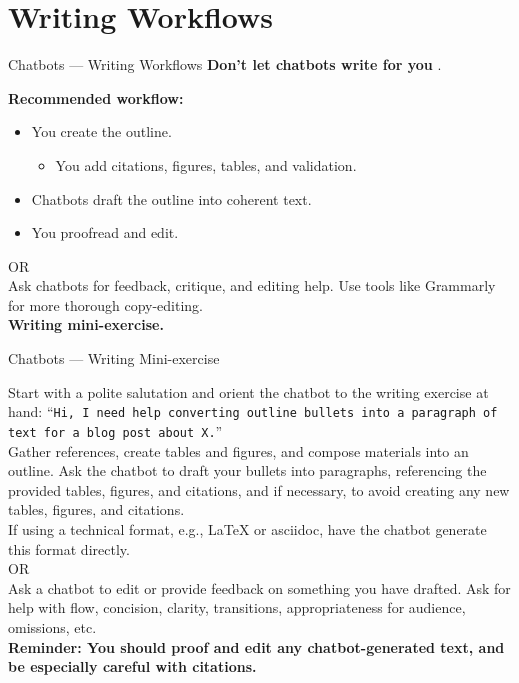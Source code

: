 \documentclass[aspectratio=169]{beamer}
\begin{document}
\section{Writing Workflows}

\begin{frame}[t]{Chatbots — Writing Workflows}
\textbf{Don’t let chatbots write for you} \parencite{alkaissi2023artificial}.

\vspace{1em}

\textbf{Recommended workflow:}
\begin{itemize}
    \item You create the outline.
    \begin{itemize}
        \item You add citations, figures, tables, and validation.
    \end{itemize}
    \item Chatbots draft the outline into coherent text.
    \item You proofread and edit.\\
\end{itemize}
\vspace{5pt}
OR\\ 
\vspace{10pt}
Ask chatbots for feedback, critique, and editing help. Use tools like Grammarly for more thorough copy-editing.\\ 
\vspace{1em}
\textbf{Writing mini-exercise.} 
\end{frame}

\begin{frame}[t]{Chatbots — Writing Mini-exercise}

\footnotesize
Start with a polite salutation and orient the chatbot to the writing exercise at hand: ``\texttt{Hi, I need help converting outline bullets into a paragraph of text for a blog post about X.}''\\
\vspace{1em}
Gather references, create tables and figures, and compose materials into an outline. Ask the chatbot to draft your bullets into paragraphs, referencing the provided tables, figures, and citations, and if necessary, to avoid creating any new tables, figures, and citations. \\
\vspace{1em}
If using a technical format, e.g., LaTeX or asciidoc, have the chatbot generate this format directly.\\
\vspace{1em}
OR\\
\vspace{1em}
Ask a chatbot to edit or provide feedback on something you have drafted. Ask for help with flow, concision, clarity, transitions, appropriateness for audience, omissions, etc.\\
\vspace{1em} 
\textbf{Reminder: You should proof and edit any chatbot-generated text, and be especially careful with citations.} 

\end{frame}
\end{document}
